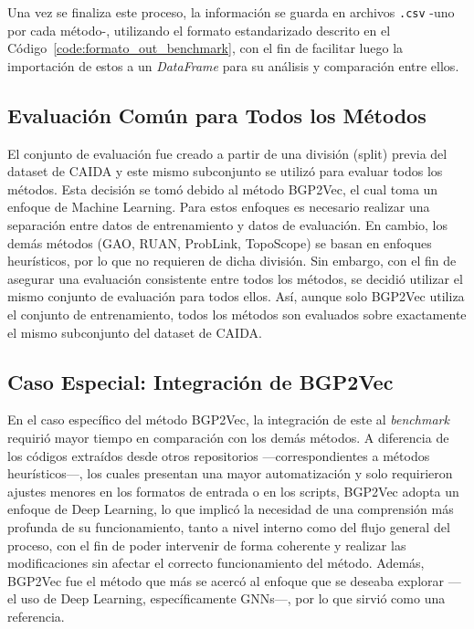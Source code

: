 


Una vez se finaliza este proceso, la información se guarda en archivos \texttt{.csv} -uno por cada método-, utilizando el formato estandarizado descrito en el Código~\ref{code:formato_out_benchmark}, con el fin de facilitar luego la importación de estos a un \textit{DataFrame} para su análisis y comparación entre ellos.\\


\subsection{Evaluación Común para Todos los Métodos}
El conjunto de evaluación fue creado a partir de una división (split) previa del dataset de CAIDA y este mismo subconjunto se utilizó para evaluar todos los métodos. Esta decisión se tomó debido al método BGP2Vec, el cual toma un enfoque de Machine Learning. Para estos enfoques es necesario realizar una separación entre datos de entrenamiento y datos de evaluación. En cambio, los demás métodos (GAO, RUAN, ProbLink, TopoScope) se basan en enfoques heurísticos, por lo que no requieren de dicha división. Sin embargo, con el fin de asegurar una evaluación consistente entre todos los métodos, se decidió utilizar el mismo conjunto de evaluación para todos ellos. Así, aunque solo BGP2Vec utiliza el conjunto de entrenamiento, todos los métodos son evaluados sobre exactamente el mismo subconjunto del dataset de CAIDA.\\




\subsection{Caso Especial: Integración de BGP2Vec}

En el caso específico del método BGP2Vec, la integración de este al \textit{benchmark} requirió mayor tiempo en comparación con los demás métodos. A diferencia de los códigos extraídos desde  otros repositorios —correspondientes a métodos heurísticos—, los cuales 
presentan una mayor automatización y solo  requirieron ajustes menores en los formatos de entrada o en los scripts, BGP2Vec adopta un enfoque de Deep Learning, lo que implicó la necesidad de una comprensión más profunda de su funcionamiento, tanto a nivel interno como del flujo general del proceso, con el fin de poder intervenir de forma coherente y realizar las modificaciones sin afectar el correcto funcionamiento del método. 
Además, BGP2Vec fue el método que más se acercó al enfoque que se deseaba explorar —el uso de Deep Learning, específicamente GNNs—, por lo que sirvió como una referencia. \\


